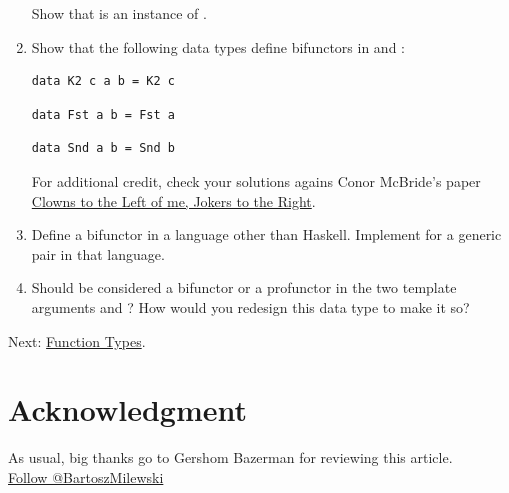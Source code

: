 \begin{enumerate}
  Show that  is an instance of .
\item
  Show that the following data types define bifunctors in  and
  :

\begin{verbatim}
data K2 c a b = K2 c
\end{verbatim}

\begin{verbatim}
data Fst a b = Fst a
\end{verbatim}

\begin{verbatim}
data Snd a b = Snd b
\end{verbatim}

  For additional credit, check your solutions agains Conor McBride's
  paper \href{http://strictlypositive.org/CJ.pdf}{Clowns to the Left of
  me, Jokers to the Right}.
\item
  Define a bifunctor in a language other than Haskell. Implement
   for a generic pair in that language.
\item
  Should  be considered a bifunctor or a profunctor in
  the two template arguments  and ? How would you
  redesign this data type to make it so?
\end{enumerate}

Next:
\href{https://bartoszmilewski.com/2015/03/13/function-types/}{Function
Types}.

\section{Acknowledgment}\label{acknowledgment}

As usual, big thanks go to Gershom Bazerman for reviewing this
article.\\
\href{https://twitter.com/BartoszMilewski}{Follow @BartoszMilewski}
